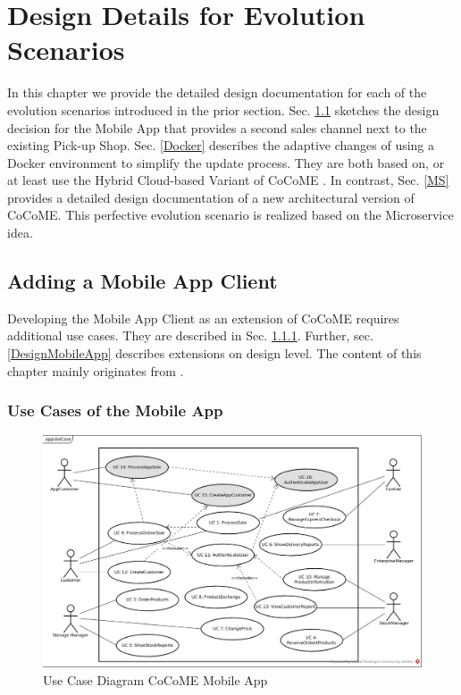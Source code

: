 \chapter{Design Details for Evolution Scenarios}
\label{c:design}
In this chapter we provide the detailed design documentation for each of the evolution scenarios
introduced in the prior section. Sec. \ref{App} sketches the design decision for the Mobile App that provides a second sales channel next to the existing Pick-up Shop. Sec. \ref{Docker} describes the adaptive changes of using a Docker environment to simplify the update process. They are both based on, or at least use the Hybrid Cloud-based Variant of CoCoME \cite{HeinrichRostamiReussner2016_1000052688}. In contrast, Sec. \ref{MS} provides a detailed design documentation of a new architectural version of CoCoME. This perfective evolution scenario is realized based on the Microservice idea.

\section{Adding a Mobile App Client} \label{App}
Developing the Mobile App Client as an extension of CoCoME requires additional use cases. They are described in Sec. \ref{UseCasesMobileApp}. Further, sec. \ref{DesignMobileApp} describes extensions on design level. The content of this chapter mainly originates from \cite{schnabel}.
\subsection{Use Cases of the Mobile App}\label{UseCasesMobileApp}
		\begin{figure}[t]
			\includegraphics[width=\textwidth]{img/appUseCase.jpg}
			\caption{Use Case Diagram CoCoME Mobile App}
		\end{figure}

